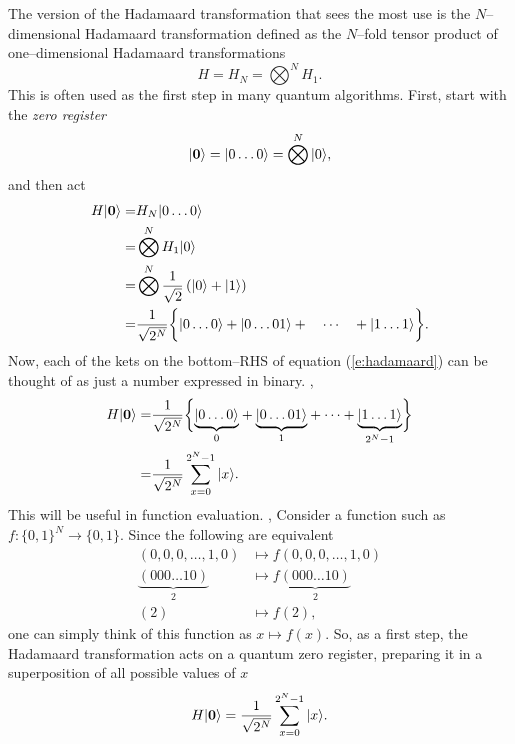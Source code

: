 The version of the Hadamaard transformation that sees the most use is
the $N$--dimensional Hadamaard transformation defined as the $N$--fold
tensor product of one--dimensional Hadamaard transformations
\begin{equation}
H= H_N= \bigotimes^N H_1.
\end{equation}
This is often used as the first step in many quantum algorithms.
First, start with the \emph{zero register}
\begin{equation}
{|{\bf 0}\rangle}={|{0\ldots 0}\rangle} = \bigotimes^N{|{0}\rangle},
\end{equation} and then act
\begin{equation}
\begin{split}
H{|{\bf 0}\rangle} =& H_N{|{0\ldots 0}\rangle}\\
=& \bigotimes^N H_1{|{0}\rangle}\\
=& \bigotimes^N \frac{1}{\sqrt{2}}\left({|{0}\rangle} +{|{1}\rangle}\right)\\
=& \frac{1}{\sqrt{2^N}}\biggl\lbrace {|{0\ldots 0}\rangle} + {|{0\ldots 01}\rangle} +
\quad\cdots\quad + {|{1\ldots 1}\rangle}\biggr\rbrace.
\end{split}
\label{e:hadamaard}
\end{equation}
Now, each of the kets on the bottom--RHS of equation (\ref{e:hadamaard})
can be thought of as just a number expressed in binary. \ie,
\begin{equation}
\begin{split}
H{|{\bf 0}\rangle} =& \frac{1}{\sqrt{2^N}}\biggl\lbrace 
\underset{0}{\underbrace{{|{0\ldots 0}\rangle}}}
+ \underset{1}{\underbrace{{|{0\ldots 01}\rangle}}} + \cdots 
+ \underset{2^N-1}{\underbrace{{|{1\ldots 1}\rangle}}}\biggr\rbrace \\
=& \frac{1}{\sqrt{2^N}}\sum_{x=0}^{2^N-1} {|{x}\rangle}.
\end{split}
\end{equation}
This will be useful in function evaluation. 
\ie, Consider a function such as $f\colon\lbrace 0,1\rbrace^N\to\lbrace 
0,1\rbrace$.
Since the following are equivalent
\begin{equation}
\begin{split}
(0,0,0,\ldots,1,0)&\mapsto f(0,0,0,\ldots,1,0)\\
\underset{2}{\underbrace{(000\ldots 10)}}&
\mapsto f\underset{2}{\underbrace{(000\ldots 10)}}\\
(2)&\mapsto f(2),
\end{split}
\end{equation}
one can simply think of this function as $x\mapsto f(x)$.
So, as a first step, the Hadamaard transformation acts on a quantum 
zero register, preparing it in a superposition of all possible values 
of $x$
\begin{equation}
H{|{\bf 0}\rangle} = \frac{1}{\sqrt{2^N}}\sum_{x=0}^{2^N-1} {|{x}\rangle}.
\end{equation}

